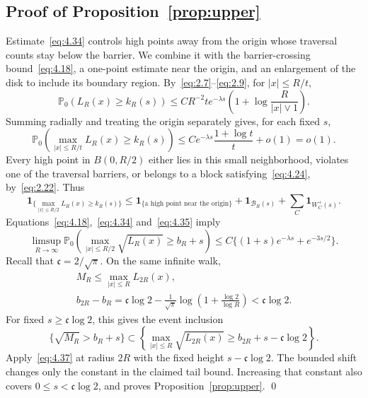 \documentclass[11pt,a4paper]{article}
\numberwithin{equation}{section}
\theoremstyle{remark}
\begin{document}
\subsection{Proof of Proposition~\ref{prop:upper}}\label{sec:uppercompletion}
Estimate~\eqref{eq:4.34} controls high points away from the origin whose traversal counts stay below the barrier. We combine it with the barrier-crossing bound~\eqref{eq:4.18}, a one-point estimate near the origin, and an enlargement of the disk to include its boundary region. By~\eqref{eq:2.7}--\eqref{eq:2.9}, for $|x|\le R/t$,
\[
\mathbb P_0(L_R(x)\ge k_R(s))
\le CR^{-2}t e^{-\lambda s}
\left(1+\log\frac R{|x|\vee1}\right).
\]
Summing radially and treating the origin separately gives, for each fixed $s$,
\begin{equation}\label{eq:4.35}
\mathbb P_0\left(\max_{|x|\le R/t}L_R(x)\ge k_R(s)\right)
\le Ce^{-\lambda s}\frac{1+\log t}{t}+o(1)=o(1).
\end{equation}
Every high point in $B(0,R/2)$ either lies in this small neighborhood, violates one of the traversal barriers, or belongs to a block satisfying~\eqref{eq:4.24}, by~\eqref{eq:2.22}. Thus
\begin{equation}\label{eq:4.36}
\mathbf1_{\{\max_{|x|\le R/2}L_R(x)\ge k_R(s)\}}
\le\mathbf1_{\{\text{a high point near the origin}\}}+\mathbf1_{\mathcal B_R(s)}
+\sum_C\mathbf1_{W_C^+(s)}.
\end{equation}
Equations~\eqref{eq:4.18},~\eqref{eq:4.34} and~\eqref{eq:4.35} imply
\begin{equation}\label{eq:4.37}
\limsup_{R\to\infty}\mathbb P_0\left(\max_{|x|\le R/2}\sqrt{L_R(x)}\ge b_R+s\right)
\le C\{(1+s)e^{-\lambda s}+e^{-3s/2}\}.
\end{equation}
Recall that $\mathfrak c=2/\sqrt\pi$. On the same infinite walk,
\[
\begin{gathered}
M_R\le\max_{|x|\le R}L_{2R}(x),\\
b_{2R}-b_R
=\mathfrak c\log2-\frac1{\sqrt\pi}
 \log\left(1+\frac{\log2}{\log R}\right)
<\mathfrak c\log2.
\end{gathered}
\]
For fixed $s\ge\mathfrak c\log2$, this gives the event inclusion
\[
\{\sqrt{M_R}>b_R+s\}
\subset
\left\{\max_{|x|\le R}\sqrt{L_{2R}(x)}
\ge b_{2R}+s-\mathfrak c\log2\right\}.
\]
Apply~\eqref{eq:4.37} at radius $2R$ with the fixed height
$s-\mathfrak c\log2$. The bounded shift changes only the constant in the claimed tail bound. Increasing that constant also covers
$0\le s<\mathfrak c\log2$, and proves Proposition~\ref{prop:upper}.
\qed
\end{document}
